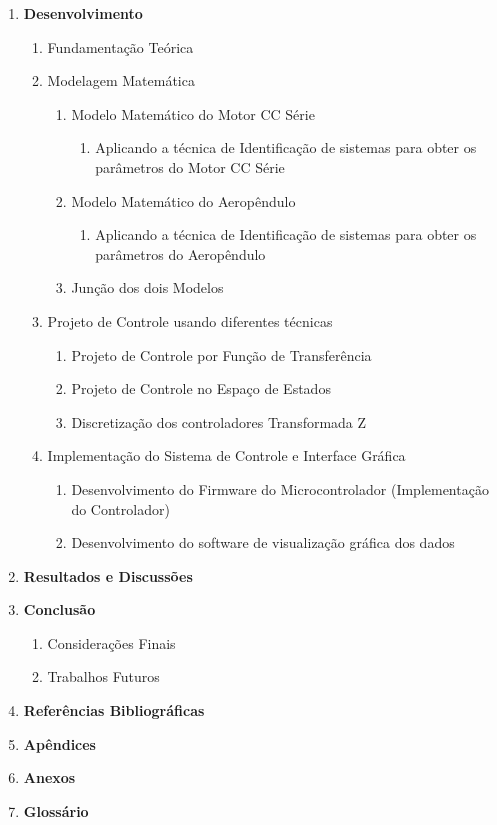 \documentclass[12pt,oneside,a4paper,brazil]{article}
\begin{document}
\begin{enumerate}
		\item \textbf{Desenvolvimento}
		\begin{enumerate}
			\item Fundamentação Teórica
			\item Modelagem Matemática
			\begin{enumerate}
				\item Modelo Matemático do Motor CC Série
					\begin{enumerate}
					\item Aplicando a técnica de Identificação de sistemas para obter os parâmetros do Motor CC Série
					\end{enumerate}
				\item Modelo Matemático do Aeropêndulo
					\begin{enumerate}
						\item Aplicando a técnica de Identificação de sistemas para obter os parâmetros do Aeropêndulo
					\end{enumerate}
				\item Junção dos dois Modelos
			\end{enumerate}
			
			
			\item Projeto de Controle usando diferentes técnicas
			\begin{enumerate}
				\item Projeto de Controle por Função de Transferência
				\item Projeto de Controle no Espaço de Estados
				\item Discretização dos controladores Transformada Z
			\end{enumerate}
		
		
			\item Implementação do Sistema de Controle e Interface Gráfica
			\begin{enumerate}
				\item Desenvolvimento do Firmware do Microcontrolador (Implementação do Controlador)
				\item Desenvolvimento do software de visualização gráfica dos dados
			\end{enumerate}
		\end{enumerate}
		
		\item \textbf{Resultados e Discussões}
		
		
		\item \textbf{Conclusão}
		\begin{enumerate}
			\item Considerações Finais
			\item Trabalhos Futuros
		\end{enumerate}
		
		\item \textbf{Referências Bibliográficas}
		\item \textbf{Apêndices}
		\item \textbf{Anexos}
		\item \textbf{Glossário}
	\end{enumerate}
\end{document}
